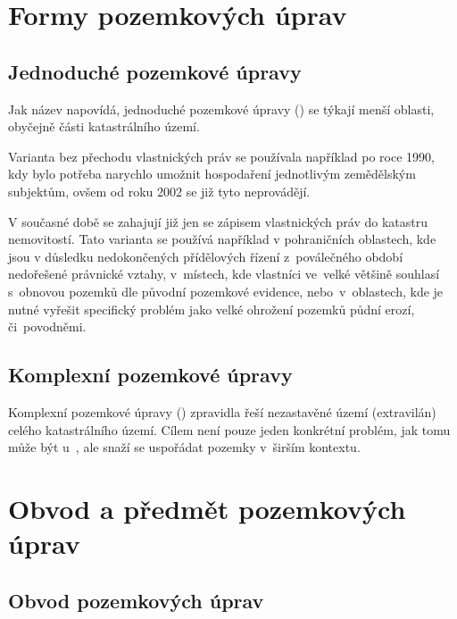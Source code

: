 \section{Formy pozemkových úprav}
\label{formy_pu}

\subsection{Jednoduché pozemkové úpravy}
\label{jednoduche_pu}

Jak název napovídá, jednoduché pozemkové úpravy () se týkají menší oblasti, obyčejně části katastrálního území.

Varianta  bez přechodu vlastnických práv se používala například po roce 1990, kdy bylo potřeba narychlo umožnit hospodaření jednotlivým zemědělským subjektům, ovšem od roku 2002 se již tyto  neprovádějí.

V současné době se zahajují již jen  se zápisem vlastnických práv do katastru nemovitostí. Tato varianta  se používá například v pohraničních oblastech, kde jsou v důsledku nedokončených přídělových řízení z~poválečného období nedořešené právnické vztahy, v~místech, kde vlastníci ve~velké většině souhlasí s~obnovou pozemků dle původní pozemkové evidence, nebo~v~oblastech, kde je nutné vyřešit specifický problém jako velké ohrožení pozemků půdní erozí, či~povodněmi.

\subsection{Komplexní pozemkové úpravy}
\label{komplexní_pu}

Komplexní pozemkové úpravy () zpravidla řeší nezastavěné území (extravilán) celého katastrálního území. Cílem  není pouze jeden konkrétní problém, jak tomu může být u~, ale snaží se uspořádat pozemky v~širším kontextu. 

\section{Obvod a předmět pozemkových úprav}
\label{obvod_a_predmet_pu}

\subsection{Obvod pozemkových úprav}
\label{obvod_pu}

